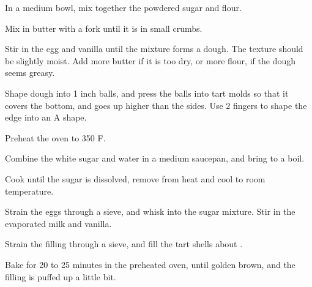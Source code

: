 In a medium bowl, mix together the powdered sugar and flour. 

Mix in butter with a fork until it is in small crumbs. 

Stir in the egg and vanilla until the mixture forms a dough. 
The texture should be slightly moist. Add more butter if it is too dry, or more flour, if the dough seems greasy. 

Shape dough into 1 inch balls, and press the balls into tart molds so that it covers the bottom, and goes up higher than the sides. 
Use 2 fingers to shape the edge into an A shape.

Preheat the oven to 350 \degree F.

Combine the white sugar and water in a medium saucepan, and bring to a boil. 

Cook until the sugar is dissolved, remove from heat and cool to room temperature. 

Strain the eggs through a sieve, and whisk into the sugar mixture. 
Stir in the evaporated milk and vanilla. 
 
Strain the filling through a sieve, and fill the tart shells about .

Bake for 20 to 25 minutes in the preheated oven, until golden brown, and the filling is puffed up a little bit.
